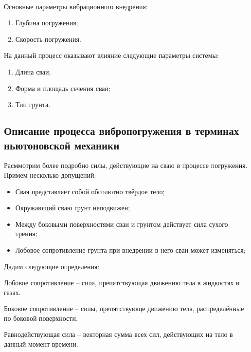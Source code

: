~\

\noindent Основные параметры вибрационного внедрения:
\begin{enumerate}
    \item Глубина погружения;
    \item Скорость погружения.
\end{enumerate}
На данный процесс оказывают влияние следующие параметры системы:
\begin{enumerate}
    \item Длина сваи;
    \item Форма и площадь сечения сваи;
    \item Тип грунта.
\end{enumerate}

\subsection{Описание процесса вибропогружения в терминах ньютоновской механики}
\label{chapter:newton}

Расммотрим более подробно силы, действующие на сваю в процессе погружения. Примем несколько допущений:

\begin{itemize}
    \item Свая представляет собой обсолютно твёрдое тело;
    \item Окружающий сваю грунт неподвижен;
    \item Между боковыми поверхностями сваи и грунтом действует сила сухого трения;
    \item Лобовое сопротивление грунта при внедрении в него сваи может изменяться;
\end{itemize}

\noindent Дадим следующие определения:

\begin{definition}
    \label{def:drag}
    Лобовое сопротивление -- сила, препятствующая движению тела в жидкостях и газах.
\end{definition}

\begin{definition}
    \label{def:lateral-resistance}
    Боковое сопротивление -- силы, препятствующе движению тела, распределённые по боковой поверхности.
\end{definition}

\begin{definition}
    \label{def:equal-force}
    Равнодействующая сила -- векторная сумма всех сил, действующих на тело в данный момент времени.
\end{definition}

